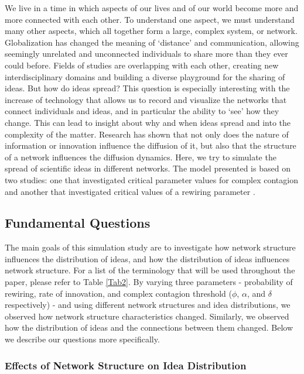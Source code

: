
We live in a time in which aspects of our lives and of our world become more and more connected with each other. To understand one aspect, we must understand many other aspects, which all together form a large, complex system, or network. Globalization has changed the meaning of `distance' and communication, allowing seemingly unrelated and unconnected individuals to share more than they ever could before. Fields of studies are overlapping with each other, creating new interdisciplinary domains and building a diverse playground for the sharing of ideas. But how do ideas spread? This question is especially interesting with the increase of technology that allows us to record and visualize the networks that connect individuals and ideas, and in particular the ability to `see' how they change. This can lead to insight about why and when ideas spread and into the complexity of the matter. Research has shown that not only does the nature of information or innovation influence the diffusion of it, but also that the structure of a network influences the diffusion dynamics. Here, we try to simulate the spread of scientific ideas in different networks. The model presented is based on two studies: one that investigated critical parameter values for complex contagion \citep{CM2007} and another that investigated critical values of a rewiring parameter \citep{HN2006}.

\subsection{Fundamental Questions}

The main goals of this simulation study are to investigate how network structure influences the distribution of ideas, and how the distribution of ideas influences network structure. For a list of the terminology that will be used throughout the paper, please refer to Table \ref{Tab2}. By varying three parameters - probability of rewiring, rate of innovation, and complex contagion threshold ($\phi$, $\alpha$, and $\delta$ respectively) - and using different network structures and idea distributions, we observed how network structure characteristics changed. Similarly, we observed how the distribution of ideas and the connections between them changed. Below we describe our questions more specifically.


\newpage


\subsubsection{Effects of Network Structure on Idea Distribution}

